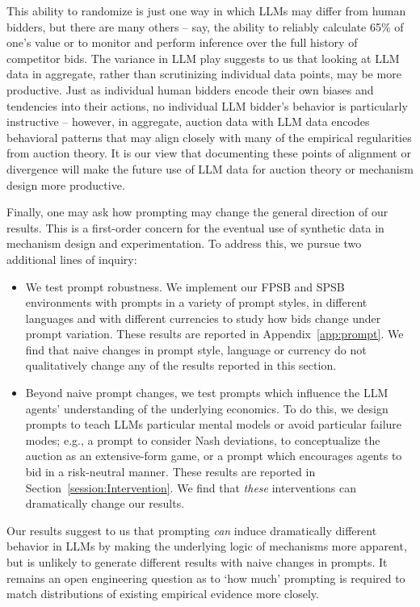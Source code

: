 \documentclass{article} %
\begin{document}
This ability to randomize is just one way in which LLMs may differ from human bidders, but there are many others -- say, the ability to reliably calculate 65\% of one's value or to monitor and perform inference over the full history of competitor bids. The variance in LLM play suggests to us that looking at LLM data in aggregate, rather than scrutinizing individual data points, may be more productive. Just as individual human bidders encode their own biases and tendencies into their actions, no individual LLM bidder's behavior is particularly instructive -- however, in aggregate, auction data with LLM data encodes behavioral patterns that may align closely with many of the empirical regularities from auction theory. It is our view that documenting these points of alignment or divergence will make the future use of LLM data for auction theory or mechanism design more productive.

Finally, one may ask how prompting may change the general direction of our results. This is a first-order concern for the eventual use of synthetic data in mechanism design and experimentation. To address this, we pursue two additional lines of inquiry:
%
\begin{itemize}
    \item[(1)] We test prompt robustness. We implement our FPSB and SPSB environments with prompts in a variety of prompt styles, in different languages and with different currencies to study how bids change under prompt variation. These results are reported in Appendix~\ref{app:prompt}. We find that naive changes in prompt style, language or currency do not qualitatively change any of the results reported in this section.
    \item[(2)] Beyond naive prompt changes, we test prompts which influence the LLM agents' understanding of the underlying economics. To do this, we design prompts to teach LLMs particular mental models or avoid particular failure modes; e.g., a prompt to consider Nash deviations, to conceptualize the auction as an extensive-form game, or a prompt which encourages agents to bid in a risk-neutral manner. These results are reported in Section~\ref{session:Intervention}. We find that \textit{these} interventions can dramatically change our results. 
\end{itemize}

Our results suggest to us that prompting \textit{can} induce dramatically different behavior in LLMs by making the underlying logic of mechanisms more apparent, but is unlikely to generate different results with naive changes in prompts. It remains an open engineering question as to `how much' prompting is required to match distributions of existing empirical evidence more closely.  
\end{document}
